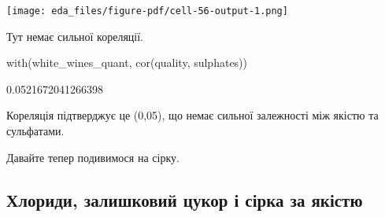 \documentclass[
  letterpaper,
  DIV=11,
  numbers=noendperiod]{scrreprt}
\newenvironment{Shaded}{\begin{snugshade}}{\end{snugshade}}
\newcommand{\AttributeTok}[1]{\textcolor[rgb]{0.40,0.45,0.13}{#1}}
\newcommand{\FloatTok}[1]{\textcolor[rgb]{0.68,0.00,0.00}{#1}}
\newcommand{\FunctionTok}[1]{\textcolor[rgb]{0.28,0.35,0.67}{#1}}
\newcommand{\NormalTok}[1]{\textcolor[rgb]{0.00,0.23,0.31}{#1}}
\newcommand{\SpecialCharTok}[1]{\textcolor[rgb]{0.37,0.37,0.37}{#1}}
\newcommand{\StringTok}[1]{\textcolor[rgb]{0.13,0.47,0.30}{#1}}
\begin{document}
\begin{Shaded}
\end{Shaded}

\texttt{[image: eda\_files/figure-pdf/cell-56-output-1.png]}

Тут немає сильної кореляції.

\begin{Shaded}
\begin{Highlighting}[]
\FunctionTok{with}\NormalTok{(white\_wines\_quant, }\FunctionTok{cor}\NormalTok{(quality, sulphates))}
\end{Highlighting}
\end{Shaded}

0.0521672041266398

Кореляція підтверджує це (0,05), що немає сильної залежності між якістю
та сульфатами.

Давайте тепер подивимося на сірку.

\subsection{Хлориди, залишковий цукор і сірка за
якістю}\label{ux445ux43bux43eux440ux438ux434ux438-ux437ux430ux43bux438ux448ux43aux43eux432ux438ux439-ux446ux443ux43aux43eux440-ux456-ux441ux456ux440ux43aux430-ux437ux430-ux44fux43aux456ux441ux442ux44e}
\end{document}
